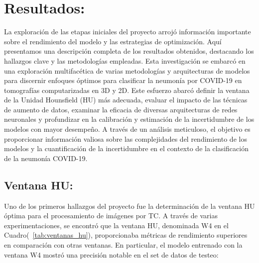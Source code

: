 \documentclass[10pt, oneside, a4paper]{article}
\begin{document}

	\section{Resultados:} \label{resultados}	
	
	La exploración de las etapas iniciales del proyecto arrojó información importante sobre el rendimiento del modelo y las estrategias de optimización. Aquí presentamos una descripción completa de los resultados obtenidos, destacando los hallazgos clave y las metodologías empleadas. Esta investigación se embarcó en una exploración multifacética de varias metodologías y arquitecturas de modelos para discernir enfoques óptimos para clasificar la neumonía por COVID-19 en tomografías computarizadas en 3D y 2D. Este esfuerzo abarcó definir la ventana de la Unidad Hounsfield (HU) más adecuada, evaluar el impacto de las técnicas de aumento de datos, examinar la eficacia de diversas arquitecturas de redes neuronales y profundizar en la calibración y estimación de la incertidumbre de los modelos con mayor desempeño. A través de un análisis meticuloso, el objetivo es proporcionar información valiosa sobre las complejidades del rendimiento de los modelos y la cuantificación de la incertidumbre en el contexto de la clasificación de la neumonía COVID-19.
	
	\subsection{Ventana HU:} \label{r_ventana_hu}
	
	Uno de los primeros hallazgos del proyecto fue la determinación de la ventana HU óptima para el procesamiento de imágenes por TC. A través de varias experimentaciones, se encontró que la ventana HU, denominada W4 en el Cuadro(~\ref{tab:ventanas_hu}), proporcionaba métricas de rendimiento superiores en comparación con otras ventanas. En particular, el modelo entrenado con la ventana W4 mostró una precisión notable en el set de datos de testeo:
\end{document}
